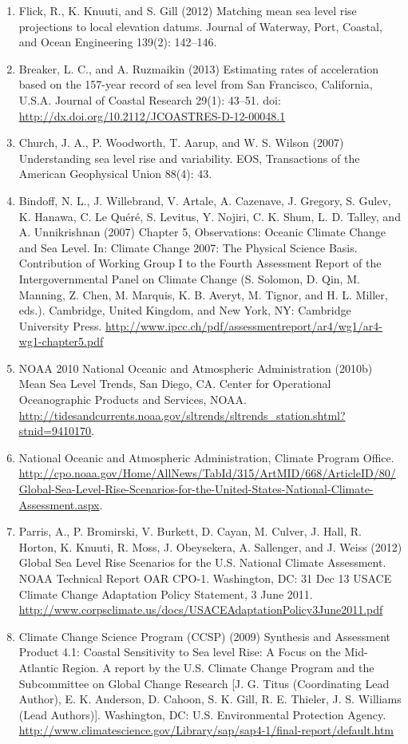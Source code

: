 \documentclass[10pt]{amsart}
\begin{document}
\begin{enumerate}
\item Flick, R., K. Knuuti, and S. Gill (2012) Matching mean sea level rise projections to local elevation datums. Journal of Waterway, Port, Coastal, and Ocean Engineering 139(2): 142–146.
\item Breaker, L. C., and A. Ruzmaikin (2013) Estimating rates of acceleration based on the 157-year record of sea level from San Francisco, California, U.S.A. Journal of Coastal Research 29(1): 43–51. doi: \url{http://dx.doi.org/10.2112/JCOASTRES-D-12-00048.1}
\item Church, J. A., P. Woodworth, T. Aarup, and W. S. Wilson (2007) Understanding sea level rise and variability. EOS, Transactions of the American Geophysical Union 88(4): 43.
\item Bindoff, N. L., J. Willebrand, V. Artale, A. Cazenave, J. Gregory, S. Gulev, K. Hanawa, C. Le Quéré, S. Levitus, Y. Nojiri, C. K. Shum, L. D. Talley, and A. Unnikrishnan (2007) Chapter 5, Observations: Oceanic Climate Change and Sea Level. In: Climate Change 2007: The Physical Science Basis. Contribution of Working Group I to the Fourth Assessment Report of the Intergovernmental Panel on Climate Change (S. Solomon, D. Qin, M. Manning, Z. Chen, M. Marquis, K. B. Averyt, M. Tignor, and H. L. Miller, eds.). Cambridge, United Kingdom, and New York, NY: Cambridge University Press. \url{http://www.ipcc.ch/pdf/assessmentreport/ar4/wg1/ar4-wg1-chapter5.pdf}
\item NOAA 2010 National Oceanic and Atmospheric Administration (2010b) Mean Sea Level Trends, San Diego, CA. Center for Operational Oceanographic Products and Services, NOAA. \url{http://tidesandcurrents.noaa.gov/sltrends/sltrends_station.shtml?stnid=9410170}.
\item National Oceanic and Atmospheric Administration, Climate Program Office. \url{http://cpo.noaa.gov/Home/AllNews/TabId/315/ArtMID/668/ArticleID/80/Global-Sea-Level-Rise-Scenarios-for-the-United-States-National-Climate-Assessment.aspx}.
\item Parris, A., P. Bromirski, V. Burkett, D. Cayan, M. Culver, J. Hall, R. Horton, K. Knuuti, R. Moss, J. Obeysekera, A. Sallenger, and J. Weiss (2012) Global Sea Level Rise Scenarios for the U.S. National Climate Assessment. NOAA Technical Report OAR CPO-1. Washington, DC: 31 Dec 13
USACE Climate Change Adaptation Policy Statement, 3 June 2011. \url{http://www.corpsclimate.us/docs/USACEAdaptationPolicy3June2011.pdf}
\item Climate Change Science Program (CCSP) (2009) Synthesis and Assessment Product 4.1: Coastal Sensitivity to Sea level Rise: A Focus on the Mid-Atlantic Region. A report by the U.S. Climate Change Program and the Subcommittee on Global Change Research [J. G. Titus (Coordinating Lead Author), E. K. Anderson, D. Cahoon, S. K. Gill, R. E. Thieler, J. S. Williams (Lead Authors)]. Washington, DC: U.S. Environmental Protection Agency. \url{http://www.climatescience.gov/Library/sap/sap4-1/final-report/default.htm}

\end{enumerate}
\end{document}
